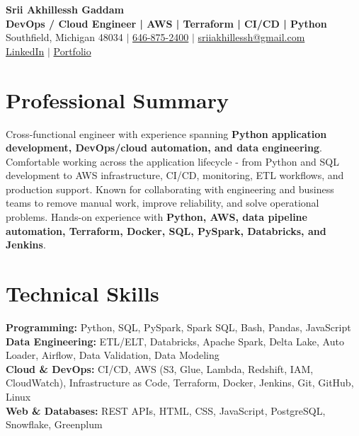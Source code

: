 \documentclass[letterpaper,10pt]{article}
\begin{document}
\fontsize{9.35pt}{10.45pt}\selectfont

\begin{center}
    {\LARGE \textbf{Srii Akhillessh Gaddam}} \\[-1pt]
    \textbf{DevOps / Cloud Engineer | AWS | Terraform | CI/CD | Python} \\[2pt]
    Southfield, Michigan 48034 $|$
    \href{tel:6468752400}{646-875-2400} $|$
    \href{mailto:sriiakhillessh@gmail.com}{sriiakhillessh@gmail.com} \\[1pt]
    \href{https://www.linkedin.com/in/srii-akhiilessh-gaddam-b48668191/}{LinkedIn} $|$
    \href{https://sriiakhillesshg.github.io/portfolio/}{Portfolio}
\end{center}
\vspace{-8pt}

\section{Professional Summary}
\small{Cross-functional engineer with experience spanning \textbf{Python application development, DevOps/cloud automation, and data engineering}. Comfortable working across the application lifecycle - from Python and SQL development to AWS infrastructure, CI/CD, monitoring, ETL workflows, and production support. Known for collaborating with engineering and business teams to remove manual work, improve reliability, and solve operational problems. Hands-on experience with \textbf{Python, AWS, data pipeline automation, Terraform, Docker, SQL, PySpark, Databricks, and Jenkins}.}

\section{Technical Skills}
\small{
\textbf{Programming:} Python, SQL, PySpark, Spark SQL, Bash, Pandas, JavaScript \\
\textbf{Data Engineering:} ETL/ELT, Databricks, Apache Spark, Delta Lake, Auto Loader, Airflow, Data Validation, Data Modeling \\
\textbf{Cloud \& DevOps:} CI/CD, AWS (S3, Glue, Lambda, Redshift, IAM, CloudWatch), Infrastructure as Code, Terraform, Docker, Jenkins, Git, GitHub, Linux \\
\textbf{Web \& Databases:} REST APIs, HTML, CSS, JavaScript, PostgreSQL, Snowflake, Greenplum
}
\end{document}
